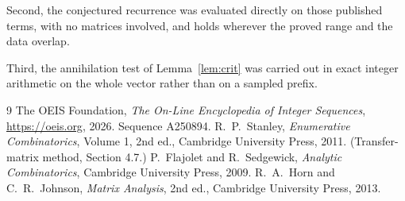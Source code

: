 \documentclass[11pt,a4paper]{article}
\theoremstyle{plain}
\theoremstyle{definition}
\begin{document}
Second, the conjectured recurrence was evaluated directly on those published terms, with no
matrices involved, and holds wherever the proved range and the data overlap.

Third, the annihilation test of Lemma~\ref{lem:crit} was carried out in exact integer
arithmetic on the whole vector rather than on a sampled prefix.

\begin{thebibliography}{9}
 The OEIS Foundation, \emph{The On-Line Encyclopedia of Integer
Sequences}, \url{https://oeis.org}, 2026. Sequence A250894.
 R.~P.~Stanley, \emph{Enumerative Combinatorics}, Volume 1, 2nd ed.,
Cambridge University Press, 2011. (Transfer-matrix method, Section 4.7.)
 P.~Flajolet and R.~Sedgewick, \emph{Analytic Combinatorics}, Cambridge
University Press, 2009.
 R.~A.~Horn and C.~R.~Johnson, \emph{Matrix Analysis}, 2nd ed., Cambridge
University Press, 2013.
\end{thebibliography}
\end{document}

